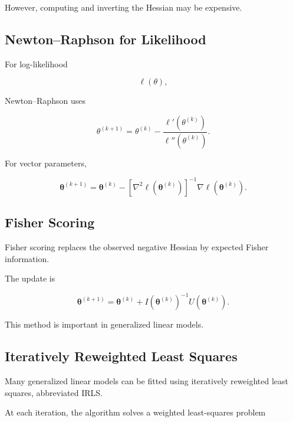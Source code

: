 However, computing and inverting the Hessian may be expensive.

\subsection{Newton--Raphson for Likelihood}
\label{subsec:newton-raphson-likelihood}

For log-likelihood

\[
\ell(\theta),
\]

Newton--Raphson uses

\[
\boxed{
\theta^{(k+1)}
=
\theta^{(k)}
-
\frac{
\ell'(\theta^{(k)})
}{
\ell''(\theta^{(k)})
}.
}
\]

For vector parameters,

\[
\boxed{
\boldsymbol{\theta}^{(k+1)}
=
\boldsymbol{\theta}^{(k)}
-
[
\nabla^2\ell
(
\boldsymbol{\theta}^{(k)}
)
]^{-1}
\nabla\ell
(
\boldsymbol{\theta}^{(k)}
).
}
\]

\subsection{Fisher Scoring}
\label{subsec:fisher-scoring}

Fisher scoring replaces the observed negative Hessian by expected Fisher
information.

The update is

\[
\boxed{
\boldsymbol{\theta}^{(k+1)}
=
\boldsymbol{\theta}^{(k)}
+
I
(
\boldsymbol{\theta}^{(k)}
)^{-1}
U
(
\boldsymbol{\theta}^{(k)}
).
}
\]

This method is important in generalized linear models.

\subsection{Iteratively Reweighted Least Squares}
\label{subsec:irls}

Many generalized linear models can be fitted using iteratively reweighted
least squares, abbreviated IRLS.

At each iteration, the algorithm solves a weighted least-squares problem

